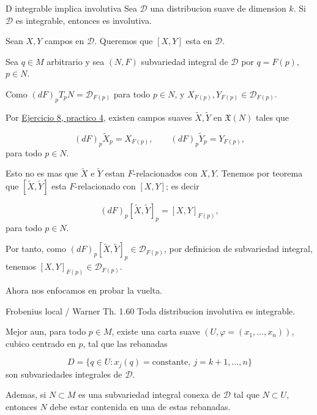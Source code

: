\begin{bookproposition}{D integrable implica involutiva}
Sea $\mathcal D$ una distribucion suave de dimension $k$. Si $\mathcal D$ es integrable, entonces es involutiva.

\end{bookproposition}
\begin{bookproof}{}
Sean $X,Y$ campos en $\mathcal D$. Queremos que $[X,Y]$ esta en $\mathcal D$.

Sea $q\in M$ arbitrario y sea $(N,F)$ subvariedad integral de $\mathcal D$ por $q=F(p)$, $p\in N$.

Como $(dF)_pT_pN=\mathcal D_{F(p)}$ para todo $p\in N$, y $X_{F(p)},Y_{F(p)}\in\mathcal D_{F(p)}$.

Por \hyperref[blk:ejercicio-8-pr4]{Ejercicio 8, practico 4}, existen campos suaves $\widetilde X,\widetilde Y$ en $\mathfrak X(N)$ tales que

\[
(dF)_p\widetilde X_p=X_{F(p)},\qquad (dF)_p\widetilde Y_p=Y_{F(p)},
\]
para todo $p\in N$.

Esto no es mas que $\widetilde X$ e $\widetilde Y$ estan $F$-relacionados con $X,Y$. Tenemos por teorema que $[\widetilde X,\widetilde Y]$ esta $F$-relacionado con $[X,Y]$; es decir

\[
(dF)_p[\widetilde X,\widetilde Y]_p=[X,Y]_{F(p)},
\]
para todo $p\in N$.

Por tanto, como $(dF)_p[\widetilde X,\widetilde Y]_p\in\mathcal D_{F(p)}$, por definicion de subvariedad integral, tenemos $[X,Y]_{F(p)}\in\mathcal D_{F(p)}$.

\bookqed
\end{bookproof}
\begin{bookremark}{}
Ahora nos enfocamos en probar la vuelta.

\end{bookremark}
\begin{booktheorem}{Frobenius local / Warner Th. 1.60}
Toda distribucion involutiva es integrable.

Mejor aun, para todo $p\in M$, existe una carta suave $(U,\varphi=(x_1,\ldots,x_n))$, cubico centrado en $p$, tal que las rebanadas

\[
D=\{q\in U:x_j(q)=\text{constante},\ j=k+1,\ldots,n\}
\]
son subvariedades integrales de $\mathcal D$.

Ademas, si $N\subset M$ es una subvariedad integral conexa de $\mathcal D$ tal que $N\subset U$, entonces $N$ debe estar contenida en una de estas rebanadas.

\end{booktheorem}

